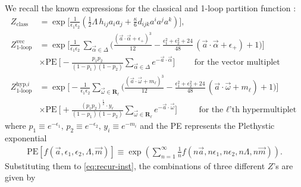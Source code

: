 \documentclass[letterpaper, 11pt]{article}
\newcommand{\nn}{\nonumber}
\def\a{\alpha}
\def\e{\epsilon}
\def\w{\omega}
\def\D{\Delta}
\begin{document}
We recall the known expressions for the classical and 1-loop partition function \cite{Intriligator:1997pq,Nekrasov:2002qd,Shadchin:2005mx}:
\begin{align}
   { Z_{\textrm{class}}} &= \exp \Bigg[\frac{1}{\epsilon_1\epsilon_2}\left(\frac{1}{2}\Lambda \, h_{ij}a_i a_j +\frac{\kappa}{6}d_{ijk} a^{i}a^j a^k\right) \Bigg],\\
   \label{eq:1-loop-vec}
   { Z_{\textrm{1-loop}}^\text{vec}} &= \exp \Bigg[\frac{1}{\epsilon_1\epsilon_2} \,  \sum_{\vec{\alpha}\in\Delta}\Big(\frac{(\vec{a}\cdot\vec{\alpha}+\e_+)^3}{12}-\frac{\e_1^2+\e_2^2+24}{48}\,(\vec{a}\cdot\vec{\alpha}+\e_+)+1\Big)\Bigg]\nn\\ & \times \text{PE}\ \Bigg[- \frac{p_1 p_2}{(1-p_1)(1-p_2) }\sum_{\vec{\a} \in \D} e^{- \vec{a} \cdot \vec{\a}}  \Bigg]  \qquad \text{ for the vector multiplet}\\
   \label{eq:1-loop-hyp}
   { Z_{\textrm{1-loop}}^\text{hyp,$i$}} &= \exp \Bigg[-\frac{1}{\epsilon_1\epsilon_2} \sum_{\vec{\omega}\in\boldsymbol{R}_\ell}\Big(\frac{(\vec{a}\cdot\vec{\omega}+m_\ell)^3}{12}-\frac{\e_1^2+\e_2^2+24}{48}\,(\vec{a}\cdot\vec{\omega}+m_\ell)+1\Big)\Bigg]\nn\\ &
   \times \text{PE}\ \Bigg[+ \frac{(p_1 p_2)^{\frac{1}{2}} \cdot  y_\ell } {(1-p_1)(1-p_2) }\sum_{\vec{\omega}\in\boldsymbol{R}_\ell}e^{-\vec{a} \cdot \vec{\w}}\Bigg] \qquad \text{ for the $\ell$'th hypermultiplet}
\end{align}
where $p_1 \equiv e^{-\e_1},\, p_2 \equiv e^{-\e_2},\, y_i \equiv e^{-m_{i}}$ and the PE represents the Plethystic exponential
\begin{align}
  \text{PE}\left[f(\vec{a},\e_1,\e_2,\Lambda,\vec{m})\right] \equiv \exp\left(\sum_{n=1}^\infty\frac{1}{n} f(n\vec{a},n\e_1,n\e_2,n\Lambda,n\vec{m})\right).
\end{align}
Substituting them to \eqref{eq:recur-inst}, the combinations of three different $Z$'s are given by
\end{document}
